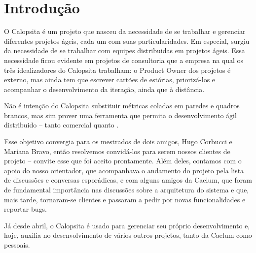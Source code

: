 \section{Introdução}
O Calopsita é um projeto que nasceu da necessidade de se trabalhar e gerenciar diferentes projetos ágeis, cada um com suas particularidades. Em especial, surgiu da necessidade de se trabalhar com equipes distribuidas em projetos ágeis. Essa necessidade ficou evidente em projetos de consultoria que a empresa na qual os três idealizadores do Calopsita trabalham: o Product Owner dos projetos é externo, mas ainda tem que escrever cartões de estórias, priorizá-los e acompanhar o desenvolvimento da iteração, ainda que à distância.

Não é intenção do Calopsita substituir métricas coladas em paredes e quadros brancos, mas sim prover uma ferramenta que permita o desenvolvimento ágil distribuido -- tanto comercial quanto \opensource.  

Esse objetivo convergia para os mestrados de dois amigos, Hugo Corbucci e Mariana Bravo, então resolvemos convidá-los para serem nossos clientes de projeto -- convite esse que foi aceito prontamente. Além deles, contamos com o apoio do nosso orientador, que acompanhava o andamento do projeto pela lista de discussões e conversas esporádicas, e com alguns amigos da Caelum, que foram de fundamental importância nas discussões sobre a arquitetura do sistema e que, mais tarde, tornaram-se clientes e passaram a pedir por novas funcionalidades e reportar bugs. 

Já desde abril, o Calopsita é usado para gerenciar seu próprio desenvolvimento e, hoje, auxilia no desenvolvimento de vários outros projetos, tanto da Caelum como pessoais.

